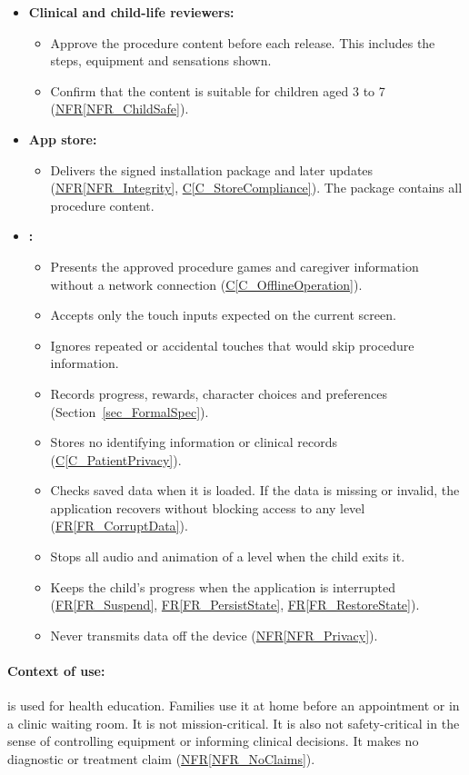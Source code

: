 \documentclass[10pt]{article}
\newcommand{\conref}[1]{\hyperref[#1]{C\ref*{#1}}}
\newcommand{\rref}[1]{\hyperref[#1]{FR\ref*{#1}}}
\newcommand{\nfrref}[1]{\hyperref[#1]{NFR\ref*{#1}}}
\begin{document}
\begin{itemize}
\item \textbf{Clinical and child-life reviewers:}
  \begin{itemize}
  \item Approve the procedure content before each release. This includes the
    steps, equipment and sensations shown.
  \item Confirm that the content is suitable for children aged 3 to 7
    (\nfrref{NFR_ChildSafe}).
  \end{itemize}

\item \textbf{App store:}
  \begin{itemize}
  \item Delivers the signed installation package and later updates
    (\nfrref{NFR_Integrity}, \conref{C_StoreCompliance}). The package contains
    all procedure content.
  \end{itemize}

\item \textbf{\progname{}:}
  \begin{itemize}
  \item Presents the approved procedure games and caregiver information without
    a network connection (\conref{C_OfflineOperation}).
  \item Accepts only the touch inputs expected on the current screen.
  \item Ignores repeated or accidental touches that would skip procedure
    information.
  \item Records progress, rewards, character choices and preferences
    (Section~\ref{sec_FormalSpec}).
  \item Stores no identifying information or clinical records
    (\conref{C_PatientPrivacy}).
  \item Checks saved data when it is loaded. If the data is missing or invalid,
    the application recovers without blocking access to any level
    (\rref{FR_CorruptData}).
  \item Stops all audio and animation of a level when the child exits it.
  \item Keeps the child's progress when the application is interrupted
    (\rref{FR_Suspend}, \rref{FR_PersistState}, \rref{FR_RestoreState}).
  \item Never transmits data off the device (\nfrref{NFR_Privacy}).
  \end{itemize}
\end{itemize}

\paragraph{Context of use:} \progname{} is used for health education. Families
use it at home before an appointment or in a clinic waiting room. It is not
mission-critical. It is also not safety-critical in the sense of controlling
equipment or informing clinical decisions. It makes no diagnostic or treatment
claim (\nfrref{NFR_NoClaims}).
\end{document}
